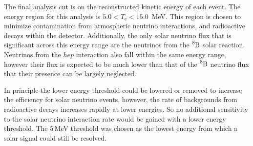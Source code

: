 The final analysis cut is on the reconstructed kinetic energy of each event.
The energy region for this analysis is $5.0 < T_{\mathrm{e}} < 15.0$\, MeV.
This region is chosen to minimize contamination from atmospheric neutrino
interactions, and radioactive decays within the detector.
Additionally, the only solar neutrino flux that is significant across this energy range
are the neutrinos from the $\ce{^{8}B}$ solar reaction.
Neutrinos from the $hep$ interaction also fall within the same energy range,
however their flux is expected to be much lower than that of the $\ce{^{8}B}$
neutrino flux that their presence can be largely neglected.

In principle the lower energy threshold could be lowered or removed to
increase the efficiency for solar neutrino events, however,
the rate of backgrounds from radioactive decays increases rapidly at lower
energies. So no additional sensitivity to the solar neutrino interaction
rate would be gained with a lower energy threshold.
The $5$\,MeV threshold was chosen as the lowest energy from which a solar
signal could still be resolved.


